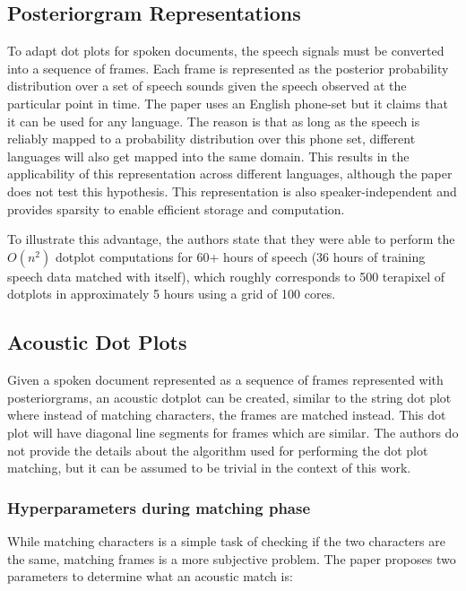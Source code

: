 \documentclass[a4paper]{article}
\begin{document}

\subsection{Posteriorgram Representations}
To adapt dot plots for spoken documents, the speech signals must be converted into a sequence of frames. Each frame is represented as the posterior probability distribution over a set of speech sounds given the speech observed at the particular point in time. The paper uses an English phone-set but it claims that it can be used for any language. The reason is that as long as the speech is reliably mapped to a probability distribution over this phone set, different languages will also get mapped into the same domain. This results in the applicability of this representation across different languages, although the paper does not test this hypothesis. This representation is also speaker-independent and provides sparsity to enable efficient storage and computation.

To illustrate this advantage, the authors state that they were able to perform the $O(n^2)$ dotplot computations for 60+ hours of speech (36 hours of training speech data matched with itself), which roughly corresponds to 500 terapixel of dotplots in approximately 5 hours using a grid of 100 cores.

\subsection{Acoustic Dot Plots}
Given a spoken document represented as a sequence of frames represented with posteriorgrams, an acoustic dotplot can be created, similar to the string dot plot where instead of matching characters, the frames are matched instead. This dot plot will have diagonal line segments for frames which are similar. The authors do not provide the details about the algorithm used for performing the dot plot matching, but it can be assumed to be trivial in the context of this work.

\subsubsection{Hyperparameters during matching phase}
While matching characters is a simple task of checking if the two characters are the same, matching frames is a more subjective problem. The paper proposes two parameters to determine what an acoustic match is:
\end{document}
